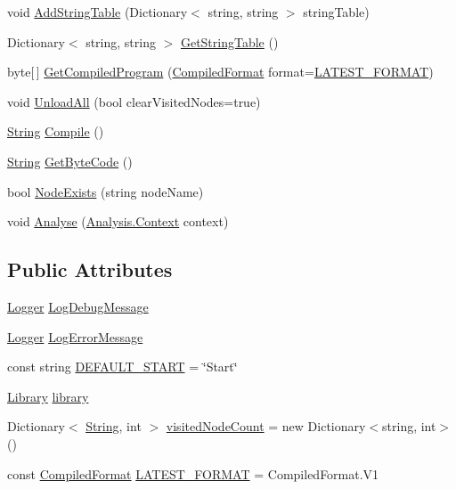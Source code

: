 \begin{DoxyCompactItemize}
\item 
void \hyperlink{a00070_acfb8561e08dc85c6d9a855ad07d18783}{Add\-String\-Table} (Dictionary$<$ string, string $>$ string\-Table)
\item 
Dictionary$<$ string, string $>$ \hyperlink{a00070_af5fe57ebd11c41208070972f06a31b9d}{Get\-String\-Table} ()
\item 
byte\mbox{[}$\,$\mbox{]} \hyperlink{a00070_a5b664d4bbe7c47c246fe0beca9648687}{Get\-Compiled\-Program} (\hyperlink{a00070_a903f18cdcc66c28ceab5a43c41fe074d}{Compiled\-Format} format=\hyperlink{a00070_a3bc83587462ade6a2f7f42cb7576e50e}{L\-A\-T\-E\-S\-T\-\_\-\-F\-O\-R\-M\-A\-T})
\item 
void \hyperlink{a00070_a7acfe32f91b36ee812059f2ad3011133}{Unload\-All} (bool clear\-Visited\-Nodes=true)
\item 
\hyperlink{a00029_a301aa7c866593a5b625a8fc158bbeacea27118326006d3829667a400ad23d5d98}{String} \hyperlink{a00070_a7a8a3a461011172f5624da3a8ffa875f}{Compile} ()
\item 
\hyperlink{a00029_a301aa7c866593a5b625a8fc158bbeacea27118326006d3829667a400ad23d5d98}{String} \hyperlink{a00070_aade6c069db8f01572060d25a963d2a14}{Get\-Byte\-Code} ()
\item 
bool \hyperlink{a00070_a93bb76a1f9a4058f225ff4cee97483c6}{Node\-Exists} (string node\-Name)
\item 
void \hyperlink{a00070_a6b67b239f50c062160666e54592c433f}{Analyse} (\hyperlink{a00035}{Analysis.\-Context} context)
\end{DoxyCompactItemize}
\subsection*{Public Attributes}
\begin{DoxyCompactItemize}
\item 
\hyperlink{a00029_a1e50031b945a3a2afafee6f590730568}{Logger} \hyperlink{a00070_a381f48bb0fbb294f8cf44ca57f11be31}{Log\-Debug\-Message}
\item 
\hyperlink{a00029_a1e50031b945a3a2afafee6f590730568}{Logger} \hyperlink{a00070_a9801e83dd044d6498fdf6ebcc6bec5ac}{Log\-Error\-Message}
\item 
const string \hyperlink{a00070_a1b643f15f734090e6a58cbf13dafd28f}{D\-E\-F\-A\-U\-L\-T\-\_\-\-S\-T\-A\-R\-T} = \char`\"{}Start\char`\"{}
\item 
\hyperlink{a00101}{Library} \hyperlink{a00070_ae660d4cfb6e296358d2f61d8ee74c66a}{library}
\item 
Dictionary$<$ \hyperlink{a00029_a301aa7c866593a5b625a8fc158bbeacea27118326006d3829667a400ad23d5d98}{String}, int $>$ \hyperlink{a00070_aae9e64354066a1e2fa130629959d772b}{visited\-Node\-Count} = new Dictionary$<$string, int$>$()
\item 
const \hyperlink{a00070_a903f18cdcc66c28ceab5a43c41fe074d}{Compiled\-Format} \hyperlink{a00070_a3bc83587462ade6a2f7f42cb7576e50e}{L\-A\-T\-E\-S\-T\-\_\-\-F\-O\-R\-M\-A\-T} = Compiled\-Format.\-V1
\end{DoxyCompactItemize}
